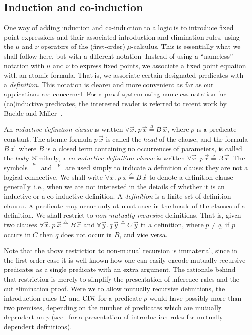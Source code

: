 \documentclass[preprint]{elsarticle}
\newcommand{\defeq}{\stackrel{\scriptscriptstyle\triangle}{=}}
\newcommand{\defmu}{\stackrel{\mu}{=}}
\newcommand{\defnu}{\stackrel{\nu}{=}}
\newcommand{\indL}{{\rm I}{\cal L}}
\newcommand{\coindR}{{\rm CI}{\cal R}}
\begin{document}
\subsection{Induction and co-induction}
\label{ssec:coind}
One way of adding induction and co-induction to a logic is to
introduce fixed point expressions and their associated introduction
and elimination rules, \ie using the $\mu$ and $\nu$ operators of the
(first-order) $\mu$-calculus. This is essentially what we shall follow
here, but with a different notation. Instead of using a ``nameless''
notation with $\mu$ and $\nu$ to express fixed points, we associate a
fixed point equation with an atomic formula. That is, we associate
certain designated predicates with a \emph{definition}.  This notation
is clearer and more convenient as far as our applications are concerned. For a proof system using nameless notation
for (co)inductive predicates, the interested reader is referred to
recent work by Baelde and Miller~\cite{baelde07lpar}.


\begin{definition}
  \label{def:def-clause}
  An \emph{inductive definition clause} is written $\forall\vec{x}.\ p
  \, \vec{x} \defmu B\,\vec{x}$, where $p$ is a predicate constant. 
The atomic formula $p \, \vec{x}$ is called the \emph{head} of the
  clause, and the formula $B\,\vec{x}$, where $B$ is a closed term
  containing no occurrences of parameters, is called the \emph{body}.
  Similarly, a \emph{ co-inductive definition clause} is written
  $\forall\vec{x}.\ p \, \vec{x} \defnu B\,\vec{x}$.  The symbols
  $\defmu$ and $\defnu$ are used simply to indicate a definition
  clause: they are not a logical connective.  We shall write $\forall
  \vec x.\ p\,\vec x \defeq B\,\vec x$ to denote a definition clause
  generally, i.e., when we are not interested in the details of
  whether it is an inductive or a co-inductive definition. A
  \emph{definition} is a finite set of definition clauses.  A predicate may
  occur only at most once in the heads of the clauses of a definition.
  We shall restrict to \emph{non-mutually recursive} definitions.
  That is, given two  clauses $\forall \vec x.\ p\, \vec x
  \defeq B\,\vec x$ and $\forall \vec y.\ q\, \vec y \defeq C\,\vec y$
  in a definition, where $p \not = q$, if $p$ occurs in $C$ then $q$
  does not occur in $B$, and vice versa.
\end{definition}
Note that the above restriction to non-mutual recursion is immaterial,
since in the first-order case it is well known how one can easily
encode mutually recursive predicates as a single predicate with an
extra argument. The rationale behind that restriction is merely to
simplify the presentation of inference rules and the cut elimination
proof.  Were we  to allow mutually recursive definitions, the
introduction rules $\indL$ and $\coindR$ for a predicate $p$ would
have possibly more than two premises, depending on the number of
predicates which are mutually dependent on $p$
(see~\cite{BrotherstonS07} for a presentation of introduction rules
for mutually dependent definitions).
\end{document}
